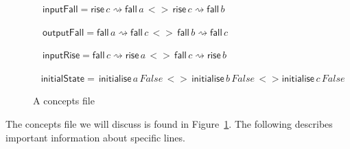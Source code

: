 \documentclass{proc}
\begin{document}
\begin{figure}[H]
\begin{centering}
\begin{flushleft}
$\,\,\,\,\,\,\mathsf{inputFall}=\mathsf{rise} \,c\rightsquigarrow \mathsf{fall} \,a \,<>\, \mathsf{rise} \,c \rightsquigarrow \mathsf{fall} \,b$
\par\end{flushleft}

\begin{flushleft}
$\,\,\,\,\,\,\mathsf{outputFall}=\mathsf{fall} \,a \rightsquigarrow \mathsf{fall} \,c \,<>\, \mathsf{fall} \,b \rightsquigarrow \mathsf{fall} \,c$
\par\end{flushleft}

\begin{flushleft}
$\,\,\,\,\,\,\mathsf{inputRise}=\mathsf{fall} \,c \rightsquigarrow \mathsf{rise} \,a \,<>\, \mathsf{fall} \,c\rightsquigarrow \mathsf{rise} \,b$
\par\end{flushleft}

\begin{flushleft}
$\,\,\,\,\,\mathsf{initialState}= \, \mathsf{initialise}\,a \, False\,<>\,\mathsf{initialise}\,b \,False\,<> \mathsf{initialise}\,c \,False \,$
\par\end{flushleft}

\par\end{centering}

\begin{centering}
\protect\caption{\label{fig:concepts_file}A concepts file}

\par\end{centering}

\end{figure}

The concepts file we will discuss is found in Figure~\ref{fig:concepts_file}. The following describes important information about specific lines.
\end{document}
